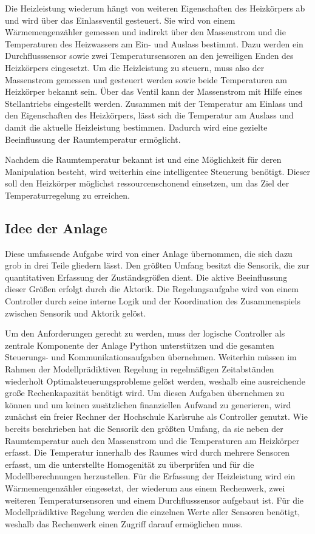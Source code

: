 Die Heizleistung wiederum hängt von weiteren Eigenschaften des Heizkörpers ab und wird über das Einlassventil gesteuert. Sie wird von einem Wärmemengenzähler gemessen und indirekt über den Massenstrom und die Temperaturen des Heizwassers am Ein- und Auslass bestimmt. Dazu werden ein Durchflusssensor sowie zwei Temperatursensoren an den jeweiligen Enden des Heizkörpers eingesetzt. Um die Heizleistung zu steuern, muss also der Massenstrom gemessen und gesteuert werden sowie beide Temperaturen am Heizkörper bekannt sein. Über das Ventil kann der Massenstrom mit Hilfe eines Stellantriebs eingestellt werden. Zusammen mit der Temperatur am Einlass und den Eigenschaften des Heizkörpers, lässt sich die Temperatur am Auslass und damit die aktuelle Heizleistung bestimmen. Dadurch wird eine gezielte Beeinflussung der Raumtemperatur ermöglicht.

Nachdem die Raumtemperatur bekannt ist und eine Möglichkeit für deren Manipulation besteht, wird weiterhin eine intelligentee Steuerung benötigt. Dieser soll den Heizkörper möglichst ressourcenschonend einsetzen, um das Ziel der Temperaturregelung zu erreichen.

\subsection{Idee der Anlage}

Diese umfassende Aufgabe wird von einer Anlage übernommen, die sich dazu grob in drei Teile gliedern lässt. Den größten Umfang besitzt die Sensorik, die zur quantitativen Erfassung der Zuständsgrößen dient. Die aktive Beeinflussung dieser Größen erfolgt durch die Aktorik. Die Regelungsaufgabe wird von einem Controller durch seine interne Logik und der Koordination des Zusammenspiels zwischen Sensorik und Aktorik gelöst.

Um den Anforderungen gerecht zu werden, muss der logische Controller als zentrale Komponente der Anlage Python unterstützen und die gesamten Steuerungs- und Kommunikationsaufgaben übernehmen. Weiterhin müssen im Rahmen der Modellprädiktiven Regelung in regelmäßigen Zeitabständen wiederholt Optimalsteuerungsprobleme gelöst werden, weshalb eine ausreichende große Rechenkapazität benötigt wird. Um diesen Aufgaben übernehmen zu können und um keinen zusätzlichen finanziellen Aufwand zu generieren, wird zunächst ein freier Rechner der Hochschule Karlsruhe als Controller genutzt.  
Wie bereits beschrieben hat die Sensorik den größten Umfang, da sie neben der Raumtemperatur auch den Massenstrom und die Temperaturen am Heizkörper erfasst. Die Temperatur innerhalb des Raumes wird durch mehrere Sensoren erfasst, um die unterstellte Homogenität zu überprüfen und für die Modellberechnungen herzustellen. Für die Erfassung der Heizleistung wird ein Wärmemengenzähler eingesetzt, der wiederum aus einem Rechenwerk, zwei weiteren Temperatursensoren und einem Durchflusssensor aufgebaut ist. Für die Modellprädiktive Regelung werden die einzelnen Werte aller Sensoren benötigt, weshalb das Rechenwerk einen Zugriff darauf ermöglichen muss.

